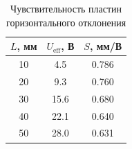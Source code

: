 \begin{table}[h]
\centering
\caption{Чувствительность пластин горизонтального отклонения}
\label{tab:pgo}
\begin{tabular}{|c|c|c|}
\hline
$L$, мм & $U_{\text{eff}}$, В & $S$, мм/В \\
\hline
10 & 4.5 & 0.786 \\
20 & 9.3 & 0.760 \\
30 & 15.6 & 0.680 \\
40 & 22.1 & 0.640 \\
50 & 28.0 & 0.631 \\
\hline
\end{tabular}
\end{table}
